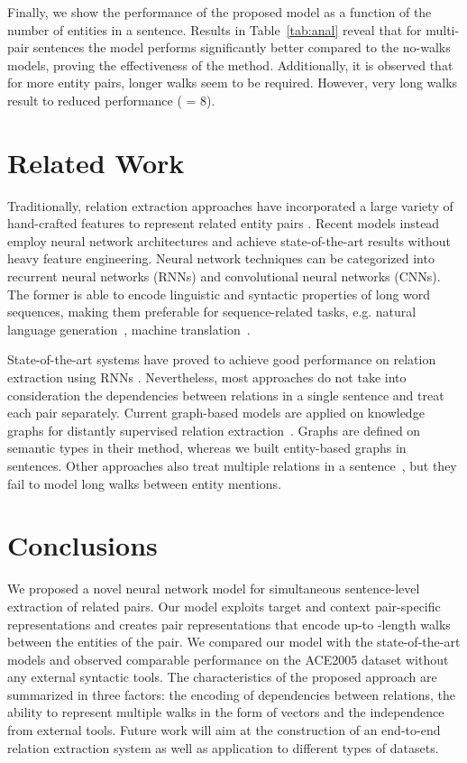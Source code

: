 \documentclass[11pt,a4paper]{article}
\begin{document}
    Finally, we show the performance of the proposed model as a function of the number of entities in a sentence. Results in Table~\ref{tab:anal} reveal that for multi-pair sentences the model performs significantly better compared to the no-walks models, proving the effectiveness of the method. Additionally, it is observed that for more entity pairs, longer walks seem to be required. However, very long walks result to reduced performance ( = 8).
    
    
\section{Related Work}
	Traditionally, relation extraction approaches have incorporated a large variety of hand-crafted features to represent related entity pairs \cite{hermann2013role,miwa2014table,nguyen2014employing,gormley2015embedding}. 
	Recent models instead employ neural network architectures and achieve state-of-the-art results without heavy feature engineering. 
	Neural network techniques can be categorized into recurrent neural networks (RNNs) and convolutional neural networks (CNNs). The former is able to encode linguistic and syntactic properties of long word sequences, making them preferable for sequence-related tasks, e.g. natural language generation~\cite{goyal2016natural}, machine translation~\cite{sutskever2014sequence}. 
	
	State-of-the-art systems have proved to achieve good performance on relation extraction using RNNs \cite{cai2016bidirectional,miwa2016end,xu2016improved,liu2015dependency}. Nevertheless, most approaches do not take into consideration the dependencies between relations in a single sentence \cite{santos2015ranking,nguyen2015perspective} and treat each pair separately.
	Current graph-based models are applied on knowledge graphs for distantly supervised relation extraction~\cite{zeng2017paths}. Graphs are defined on semantic types in their method, whereas we built entity-based graphs in sentences. 
    Other approaches also treat multiple relations in a sentence~\cite{gupta2016table,miwa2014table,li2014incremental}, but they fail to model long walks between entity mentions.    
	

\section{Conclusions}  
	We proposed a novel neural network model for simultaneous sentence-level extraction of related pairs. 
    Our model exploits target and context pair-specific representations and creates pair representations that encode up-to -length walks between the entities of the pair. 
    We compared our model with the state-of-the-art models and observed comparable performance on the ACE2005 dataset without any external syntactic tools. 
    The characteristics of the proposed approach are summarized in three factors: the encoding of dependencies between relations, the ability to represent multiple walks in the form of vectors and the independence from external tools. 
    Future work will aim at the construction of an end-to-end relation extraction system as well as application to different types of datasets.
	
\end{document}
